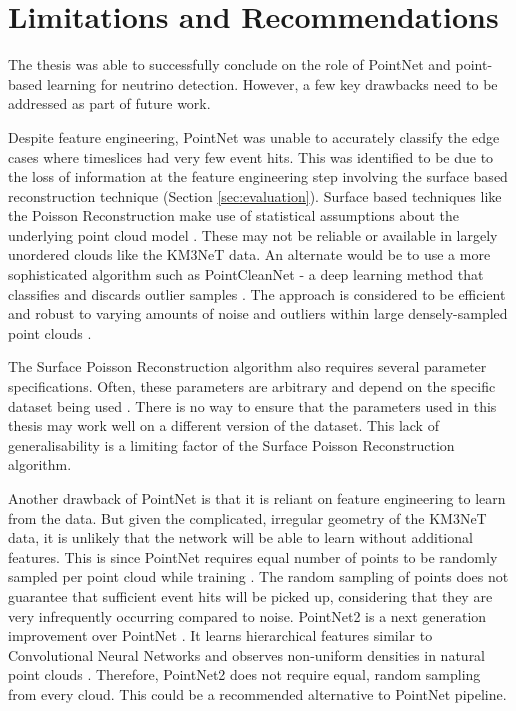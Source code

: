 \chapter{Limitations and Recommendations}
\label{sec:limitations}
The thesis was able to successfully conclude on the role of PointNet and point-based learning for neutrino detection. However, a few key drawbacks need to be addressed as part of future work. 

Despite feature engineering, PointNet was unable to accurately classify the edge cases where timeslices had very few event hits. This was identified to be due to the loss of information at the feature engineering step involving the surface based reconstruction technique (Section \ref{sec:evaluation}). Surface based techniques like the Poisson Reconstruction make use of statistical assumptions about the underlying point cloud model \cite{rakotosaona2020pointcleannet}. These may not be reliable or available in largely unordered clouds like the KM3NeT data. An alternate would be to use a more sophisticated algorithm such as PointCleanNet - a deep learning method that classifies and discards outlier samples \cite{rakotosaona2020pointcleannet}. The approach is considered to be efficient and robust to varying amounts of noise and outliers within large densely-sampled point clouds \cite{rakotosaona2020pointcleannet}.

The Surface Poisson Reconstruction algorithm also requires several parameter specifications. Often, these parameters are arbitrary and depend on the specific dataset being used \cite{kazhdan2006poisson}. There is no way to ensure that the parameters used in this thesis may work well on a different version of the dataset. This lack of generalisability is a limiting factor of the Surface Poisson Reconstruction algorithm.

Another drawback of PointNet is that it is reliant on feature engineering to learn from the data. But given the complicated, irregular geometry of the KM3NeT data, it is unlikely that the network will be able to learn without additional features. This is since PointNet requires equal number of points to be randomly sampled per point cloud while training \cite{qi2017pointnet}. The random sampling of points does not guarantee that sufficient event hits will be picked up, considering that they are very infrequently occurring compared to noise. PointNet2 is a next generation improvement over PointNet \cite{qi2017pointnet++}. It learns hierarchical features similar to Convolutional Neural Networks and observes non-uniform densities in natural point clouds \cite{qi2017pointnet++}. Therefore, PointNet2 does not require equal, random sampling from every cloud. This could be a recommended alternative to PointNet pipeline. 

